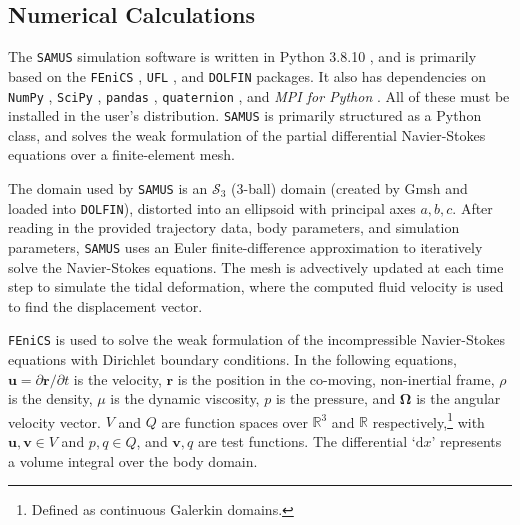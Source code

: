 \documentclass[twocolumn,doublespacing]{aastex631}
\begin{document}
\subsection{Numerical Calculations}
 
The \texttt{SAMUS} simulation software is written in Python 3.8.10 \citep{python3}, and is primarily based on the \texttt{FEniCS} \citep{fenics1,fenics2}, \texttt{UFL} \citep{UFL}, and \texttt{DOLFIN} \citep{dolfin1,dolfin2} packages. It also has dependencies on \texttt{NumPy} \citep{numpy}, \texttt{SciPy} \citep{scipy}, \texttt{pandas} \citep{pandas1,pandas2}, \texttt{quaternion} \citep{quaternion}, and \textit{MPI for Python} \citep{mpi1,mpi2,mpi3,mpi4}. All of these must be installed in the user's distribution. \texttt{SAMUS} is primarily structured as a Python class, and solves the weak formulation of the partial differential Navier-Stokes equations over a finite-element mesh.

The domain used by \texttt{SAMUS} is an $\mathcal{S}_3$ (3-ball) domain (created by Gmsh \citep{gmsh} and loaded into \texttt{DOLFIN}), distorted into an ellipsoid with principal axes $a,b,c$. After reading in the provided trajectory data, body parameters, and simulation parameters, \texttt{SAMUS} uses an Euler finite-difference approximation to iteratively solve the Navier-Stokes equations. The mesh is advectively updated at each time step to simulate the tidal deformation, where the computed fluid velocity is used to find the displacement vector. 

\texttt{FEniCS} is used to solve the weak formulation of the incompressible Navier-Stokes equations with Dirichlet boundary conditions. In the following equations, $\boldsymbol{u}=\partial\boldsymbol{r}/\partial t$ is the velocity, $\boldsymbol{r}$ is the position in the co-moving, non-inertial frame, $\rho$ is the density, $\mu$ is the dynamic viscosity, $p$ is the pressure, and $\boldsymbol{\Omega}$ is the angular velocity vector. $V$ and $Q$ are function spaces over $\mathds{R}^3$ and $\mathds{R}$ respectively,\footnote{Defined as continuous Galerkin domains.} with $\boldsymbol{u},\boldsymbol{v}\in V$ and $p,q\in Q$, and $\boldsymbol{v},q$ are test functions. The differential `$\text{d}x$' represents a volume integral over the body domain. 
\end{document}

